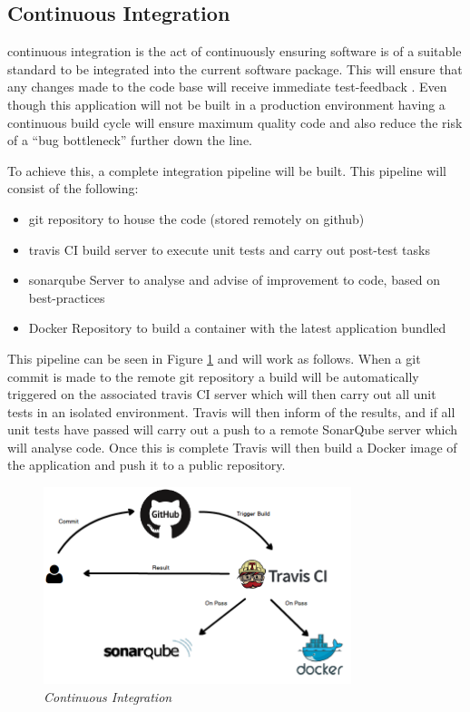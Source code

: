 \subsection{Continuous Integration}
\label{subs:CI}
\gls{continuous integration} is the act of continuously ensuring software is of a suitable standard to be integrated into the current software package. This will ensure that any changes made to the code base will receive immediate test-feedback \citep{Fowler2006}. Even though this application will not be built in a production environment having a continuous build cycle will ensure maximum quality code and also reduce the risk of a ``bug bottleneck'' further down the line.

To achieve this, a complete integration pipeline will be built. This pipeline will consist of the following:

\begin{itemize}
	\item \gls{git} repository to house the code (stored remotely on \gls{github})
	\item \gls{travis} CI build server to execute unit tests and carry out post-test tasks
	\item \gls{sonarqube} Server to analyse and advise of improvement to code, based on best-practices
	\item Docker Repository to build a container with the latest application bundled
\end{itemize}

This pipeline can be seen in Figure \ref{fig:CI} and will work as follows. When a git commit is made to the remote git repository a build will be automatically triggered on the associated \gls{travis} CI server which will then carry out all unit tests in an isolated environment. Travis will then inform of the results, and if all unit tests have passed will carry out a push to a remote SonarQube server which will analyse code. Once this is complete Travis will then build a Docker image of the application and push it to a public repository.

\begin{figure}[!ht]
\centering
\includegraphics*[width=0.8\textwidth]{images/CI}
\caption{\em Continuous Integration}
\label{fig:CI}
\end{figure}

